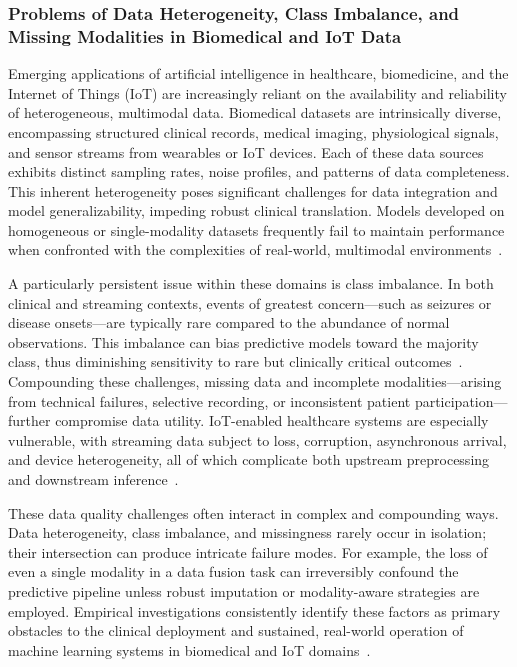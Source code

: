\documentclass[sigconf]{acmart}
\begin{document}
\subsubsection{Problems of Data Heterogeneity, Class Imbalance, and Missing Modalities in Biomedical and IoT Data}

Emerging applications of artificial intelligence in healthcare, biomedicine, and the Internet of Things (IoT) are increasingly reliant on the availability and reliability of heterogeneous, multimodal data. Biomedical datasets are intrinsically diverse, encompassing structured clinical records, medical imaging, physiological signals, and sensor streams from wearables or IoT devices. Each of these data sources exhibits distinct sampling rates, noise profiles, and patterns of data completeness. This inherent heterogeneity poses significant challenges for data integration and model generalizability, impeding robust clinical translation. Models developed on homogeneous or single-modality datasets frequently fail to maintain performance when confronted with the complexities of real-world, multimodal environments~\cite{ref78,ref82,ref83}.

A particularly persistent issue within these domains is class imbalance. In both clinical and streaming contexts, events of greatest concern—such as seizures or disease onsets—are typically rare compared to the abundance of normal observations. This imbalance can bias predictive models toward the majority class, thus diminishing sensitivity to rare but clinically critical outcomes~\cite{ref83,ref84}. Compounding these challenges, missing data and incomplete modalities—arising from technical failures, selective recording, or inconsistent patient participation—further compromise data utility. IoT-enabled healthcare systems are especially vulnerable, with streaming data subject to loss, corruption, asynchronous arrival, and device heterogeneity, all of which complicate both upstream preprocessing and downstream inference~\cite{ref90,ref106}.

These data quality challenges often interact in complex and compounding ways. Data heterogeneity, class imbalance, and missingness rarely occur in isolation; their intersection can produce intricate failure modes. For example, the loss of even a single modality in a data fusion task can irreversibly confound the predictive pipeline unless robust imputation or modality-aware strategies are employed. Empirical investigations consistently identify these factors as primary obstacles to the clinical deployment and sustained, real-world operation of machine learning systems in biomedical and IoT domains~\cite{ref78,ref84,ref106}.
\end{document}
